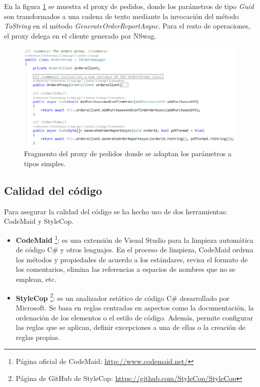 \documentclass[11pt,spanish,listoffigures]{tfgetsinf}
\begin{document}
En la figura \ref{fig:OrdersProxy} se muestra el proxy de pedidos, donde los parámetros de tipo \textit{Guid} son transformados a una cadena de texto mediante la invocación del método \textit{ToString} en el método \textit{GenerateOrderReportAsync}. Para el resto de operaciones, el proxy delega en el cliente generado por NSwag.

\begin{figure}[h]
\centering
\includegraphics[scale=0.7]{OrdersProxy}
\caption{Fragmento del proxy de pedidos donde se adaptan los parámetros a tipos simples.}
\label{fig:OrdersProxy}
\end{figure}

\newpage

\subsection{Calidad del código}

Para asegurar la calidad del código se ha hecho uso de dos herramientas: CodeMaid y StyleCop.

\begin{itemize}

\item \textbf{CodeMaid} \footnote{ Página oficial de CodeMaid: \url{http://www.codemaid.net/}}: es una extensión de Visual Studio para la limpieza automática de código C\# y otros lenguajes. En el proceso de limpieza, CodeMaid ordena los métodos y propiedades de acuerdo a los estándares, revisa el formato de los comentarios, elimina las referencias a espacios de nombres que no se emplean, etc.

\item \textbf{StyleCop} \footnote{ Página de GitHub de StyleCop: \url{https://github.com/StyleCop/StyleCop}}: es un analizador estático de código C\# desarrollado por Microsoft. Se basa en reglas centradas en aspectos como la documentación, la ordenación de los elementos o el estilo de código. Además, permite configurar las reglas que se aplican, definir excepciones a una de ellas o la creación de reglas propias.

\end{itemize}
\end{document}
